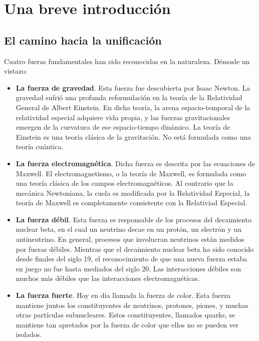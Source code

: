 \chapter{Una breve introducción}
\section{El camino hacia la unificación}
Cuatro fueras fundamentales han sido reconocidas en la naturaleza. Démosle un vistazo:
\begin{itemize}
    \item \textbf{La fuerza de gravedad}. Esta fuerza fue descubierta por Isaac Newton. La gravedad sufrió una profunda reformulación en la teoría de la Relatividad General de Albert Einstein. En dicha teoría, la arena espacio-temporal de la relatividad especial adquiere vida propia, y las fuerzas gravitacionales emergen de la curvatura de ese espacio-tiempo dinámico. La teoría de Einstein es una teoría clásica de la gravitación. No está formulada como una teoría cuántica.

    \item \textbf{La fuerza electromagnética}. Dicha fuerza es descrita por las ecuaciones de Maxwell. El electromagnetismo, o la teoría de Maxwell, es formulada como una teoría clásica de los campos electromagnéticos. Al contrario que la mecánica Newtoniana, la cuela es modificada por la Relatividad Especial, la teoría de Maxwell es completamente consistente con la Relativiad Especial.

    \item \textbf{La fuerza débil}. Esta fuerza es responsable de los procesos del decaimiento nuclear beta, en el cual un neutrino decae en un protón, un electrón y un antineutrino. En general, procesos que involucran neutrinos están medidos por fueras débiles. Mientras que el decaimiento nuclear beta ha sido conocido desde finales del siglo 19, el reconocimiento de que una nueva fuerza estaba en juego no fue hasta mediados del siglo 20. Las interacciones débiles son muchos más débiles que las interacciones electromagnéticas.

    \item \textbf{La fuerza fuerte}. Hoy en día llamada la fuerza de color. Esta fuerza mantiene juntos los constituyentes de neutrinos, protones, piones, y muchas otras partículas subnucleares. Estos constituyentes, llamados quarks, se mantiene tan apretados por la fuerza de color que ellos no se pueden ver isolados.
\end{itemize}

